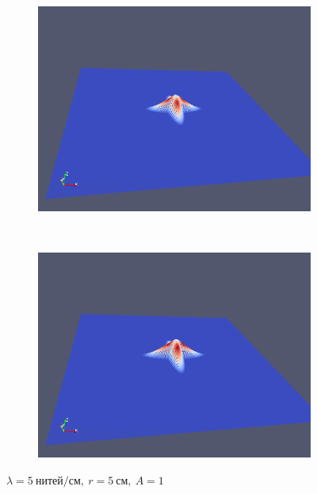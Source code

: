 \begin{figure}[H]
\begin{subfigure}[t]{0.5\textwidth}
        \includegraphics[width=\textwidth]{img/fiber/density_5_radius_5_amplitude_1/5.png}
    \end{subfigure}%
    ~
    \begin{subfigure}[t]{0.5\textwidth}
        \centering
        \includegraphics[width=\textwidth]{img/fiber/density_5_radius_5_amplitude_1/6.png}
    \end{subfigure}
    \caption{$\lambda=5~нитей/см,~r=5~см,~A=1$}
\end{figure}
